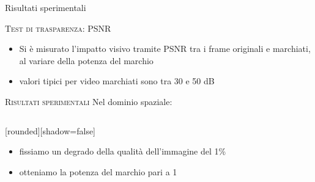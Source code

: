 \documentclass{beamer}
\begin{document}
\begin{section}{Risultati sperimentali}
\begin{frame}[t]{\textsc{Test di trasparenza: PSNR}}
\begin{block}{}
\begin{itemize}
\item Si \`{e} misurato l'impatto visivo tramite PSNR tra i frame originali e marchiati, al variare della potenza del marchio
\item valori tipici per video marchiati sono tra 30 e 50 dB
\end{itemize}
\end{block}
\vspace{4mm}
\begin{table}

\end{table}
\end{frame}

\begin{frame}[t]{\textsc{Risultati sperimentali}}
Nel dominio spaziale:
\begin{columns}
\begin{column}{5cm}
[rounded][shadow=false]
\begin{block}{}
\begin{itemize}
\item fissiamo un degrado della qualit\`{a} dell'immagine del 1\%
\item otteniamo la potenza del marchio pari a 1
\end{itemize}
\end{block}
\end{column}

\begin{column}{5cm}
\vspace{-6mm}
\begin{table}
\end{table}


\end{column}
\end{columns}
\end{frame}
\end{section}
\end{document}
